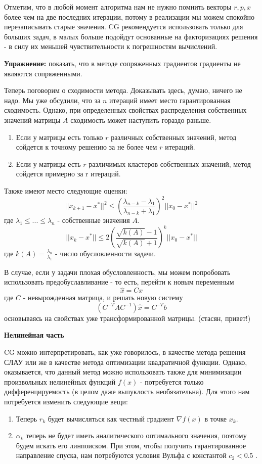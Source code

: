     Отметим, что в любой момент алгоритма нам не нужно помнить векторы $r, p, x$ более чем на две последних итерации, потому в реализации мы можем спокойно перезаписывать старые значения. CG рекомендуется использовать только для больших задач, в малых больше подойдут основанные на факторизациях решения - в силу их меньшей чувствительности к погрешностям вычислений.

    \textbf{Упражнение:} показать, что в методе сопряженных градиентов градиенты не являются сопряженными.

    Теперь поговорим о сходимости метода. Доказывать здесь, думаю, ничего не надо. Мы уже обсудили, что за $n$ итераций имеет место гарантированная сходимость. Однако, при определенных свойствах распределения собственных значений матрицы $A$ сходимость может наступить гораздо раньше.
    \begin{enumerate}
    \item Если у матрицы есть только $r$ различных собственных значений, метод сойдется к точному решению за не более чем $r$ итераций.
    \item Если у матрицы есть $r$ различимых кластеров собственных значений, метод сойдется примерно за r итераций.
    \end{enumerate}

Также имеют место следующие оценки: $$||x_{k+1} - x^*||^2 \leq \left( \frac{\lambda_{n-k} - \lambda_1}{\lambda_{n-k} + \lambda_1} \right)^2 ||x_0 - x^*||^2$$ где $\lambda_1 \leq ... \leq \lambda_n$ - собственные значения $A$.
$$||x_k - x^*|| \leq 2 \left( \frac{\sqrt{k(A)} - 1}{\sqrt{k(A)} + 1} \right)^k ||x_0 - x^*||$$
где $k(A) = \frac{\lambda_n}{\lambda_1}$ - число обусловленности задачи.

    В случае, если у задачи плохая обусловленность, мы можем попробовать использовать предобуславливание - то есть, перейти к новым переменным $$\hat{x} = Cx$$ где $C$ - невырожденная матрица, и решать новую систему $$(C^{-T} A C^{-1}) \hat{x} = C^{-T} b$$ основываясь на свойствах уже трансформированной матрицы. (стасян, привет!)

    \textbf{Нелинейная часть}

    CG можно интерпретировать, как уже говорилось, в качестве метода решения СЛАУ или же в качестве метода оптимизации квадратичной функции. Однако, оказывается, что данный метод можно использовать также для минимизации произвольных нелинейных функций $f(x)$ - потребуется только дифференцируемость (в целом даже выпуклость необязательна). Для этого нам потребуется изменить следующие вещи:
    \begin{enumerate}
\item Теперь $r_k$ будет вычисляться как честный градиент $\nabla f(x)$ в точке $x_k$.
\item $\alpha_k$ теперь не будет иметь аналитического оптимального значения, поэтому будем искать его линпоиском. При этом, чтобы получить гарантированное направление спуска, нам потребуются условия Вульфа с константой $c_2 < 0.5$ .
\end{enumerate}

